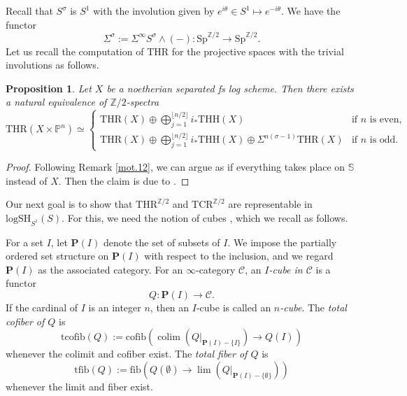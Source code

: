 \documentclass[10pt]{amsart}
\newtheorem{prop}[thm]{Proposition}
\theoremstyle{definition}
\theoremstyle{remark}
\numberwithin{equation}{section}
\newcommand{\bP}{\mathbf{P}}
\renewcommand{\P}{\mathbb{P}}
\newcommand{\Sphere}{\mathbb{S}}
\newcommand{\Z}{\mathbb{Z}}
\newcommand{\cC}{\mathcal{C}}
\newcommand{\colim}{\mathop{\mathrm{colim}}}
\newcommand{\cofib}{\mathrm{cofib}}
\newcommand{\fib}{\mathrm{fib}}
\newcommand{\Sp}{\mathrm{Sp}}
\newcommand{\tfib}{\mathrm{tfib}}
\newcommand{\tcofib}{\mathrm{tcofib}}
\newcommand{\logSH}{\mathrm{logSH}}
\newcommand{\THH}{\mathrm{THH}}
\newcommand{\THR}{\mathrm{THR}}
\newcommand{\TCR}{\mathrm{TCR}}
\newcommand{\Ztwo}{{\mathbb{Z}/2}}
\begin{document}
Recall that $S^\sigma$ is $S^1$ with the involution given by $e^{i\theta}\in S^1 \mapsto e^{-i\theta}$.
We have the functor
\[
\Sigma^\sigma
:=
\Sigma^\infty S^\sigma \wedge (-)
\colon
\Sp^{\Ztwo}\to \Sp^{\Ztwo}.
\]
Let us recall the computation of $\THR$ for the projective spaces with the trivial involutions as follows.


\begin{prop}
\label{mot.2}
Let $X$ be a noetherian separated fs log scheme.
Then there exists a natural equivalence of $\Ztwo$-spectra
\[
\THR(X\times \P^n)
\simeq
\left\{
\begin{array}{ll}
\THR(X) \oplus \bigoplus_{j=1}^{\lfloor n/2 \rfloor} i_*\THH(X) & \text{if $n$ is even},
\\
\THR(X) \oplus \bigoplus_{j=1}^{\lfloor n/2 \rfloor} i_*\THH(X) \oplus \Sigma^{n(\sigma-1)}\THR(X) & \text{if $n$ is odd}.
\end{array}
\right.
\]
\end{prop}
\begin{proof}
Following Remark \ref{mot.12},
we can argue as if everything takes place on $\Sphere$ instead of $X$.
Then the claim is due to \cite[Theorem 5.2.6]{THR}.
\end{proof}


Our next goal is to show that $\THR^{\Z/2}$ and $\TCR^{\Z/2}$ are representable in $\logSH_{S^1}(S)$.
For this,
we need the notion of cubes \cite[Definition 6.1.1.2]{HA},
which we recall as follows.

For a set $I$,
let $\bP(I)$ denote the set of subsets of $I$.
We impose the partially ordered set structure on $\bP(I)$ with respect to the inclusion,
and we regard $\bP(I)$ as the associated category.
For an $\infty$-category $\cC$,
an \emph{$I$-cube in $\cC$} is a functor
\[
Q
\colon
\bP(I)
\to
\cC.
\]
If the cardinal of $I$ is an integer $n$,
then an $I$-cube is called an \emph{$n$-cube}.
The \emph{total cofiber of $Q$} is
\[
\tcofib(Q)
:=
\cofib(\colim(Q|_{\bP(I)-\{I\}}) \to Q(I))
\]
whenever the colimit and cofiber exist.
The \emph{total fiber of $Q$} is
\[
\tfib(Q)
:=
\fib(Q(\emptyset)\to \lim(Q|_{\bP(I)-\{\emptyset\}}))
\]
whenever the limit and fiber exist.
\end{document}
